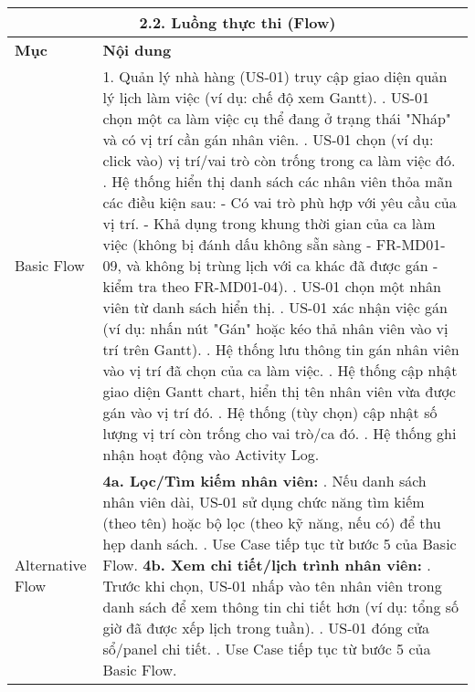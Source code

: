 \begin{longtable}{|m{4cm}|p{11cm}|}
\hline
\multicolumn{2}{|c|}{\textbf{2.2. Luồng thực thi (Flow)}} \\
\hline
\textbf{Mục} & \textbf{Nội dung} \\
\hline
Basic Flow & 1. Quản lý nhà hàng (US-01) truy cập giao diện quản lý lịch làm việc (ví dụ: chế độ xem Gantt). \newline 2. US-01 chọn một ca làm việc cụ thể đang ở trạng thái "Nháp" và có vị trí cần gán nhân viên. \newline 3. US-01 chọn (ví dụ: click vào) vị trí/vai trò còn trống trong ca làm việc đó. \newline 4. Hệ thống hiển thị danh sách các nhân viên thỏa mãn các điều kiện sau: \newline    - Có vai trò phù hợp với yêu cầu của vị trí. \newline    - Khả dụng trong khung thời gian của ca làm việc (không bị đánh dấu không sẵn sàng - FR-MD01-09, và không bị trùng lịch với ca khác đã được gán - kiểm tra theo FR-MD01-04). \newline 5. US-01 chọn một nhân viên từ danh sách hiển thị. \newline 6. US-01 xác nhận việc gán (ví dụ: nhấn nút "Gán" hoặc kéo thả nhân viên vào vị trí trên Gantt). \newline 7. Hệ thống lưu thông tin gán nhân viên vào vị trí đã chọn của ca làm việc. \newline 8. Hệ thống cập nhật giao diện Gantt chart, hiển thị tên nhân viên vừa được gán vào vị trí đó. \newline 9. Hệ thống (tùy chọn) cập nhật số lượng vị trí còn trống cho vai trò/ca đó. \newline 10. Hệ thống ghi nhận hoạt động vào Activity Log. \\
\hline
Alternative Flow & \textbf{4a. Lọc/Tìm kiếm nhân viên:} \newline    1. Nếu danh sách nhân viên dài, US-01 sử dụng chức năng tìm kiếm (theo tên) hoặc bộ lọc (theo kỹ năng, nếu có) để thu hẹp danh sách. \newline    2. Use Case tiếp tục từ bước 5 của Basic Flow. \newline \textbf{4b. Xem chi tiết/lịch trình nhân viên:} \newline    1. Trước khi chọn, US-01 nhấp vào tên nhân viên trong danh sách để xem thông tin chi tiết hơn (ví dụ: tổng số giờ đã được xếp lịch trong tuần). \newline    2. US-01 đóng cửa sổ/panel chi tiết. \newline    3. Use Case tiếp tục từ bước 5 của Basic Flow. \\

\end{longtable}
